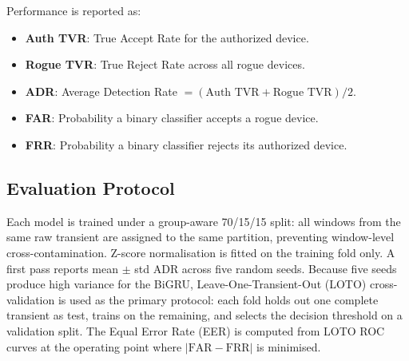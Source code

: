 Performance is reported as:
\begin{itemize}
  \item \textbf{Auth TVR}: True Accept Rate for the authorized device.
  \item \textbf{Rogue TVR}: True Reject Rate across all rogue devices.
  \item \textbf{ADR}: Average Detection Rate $= (\text{Auth TVR} + \text{Rogue TVR})/2$.
  \item \textbf{FAR}: Probability a binary classifier accepts a rogue device.
  \item \textbf{FRR}: Probability a binary classifier rejects its authorized device.
\end{itemize}

\subsection{Evaluation Protocol}
Each model is trained under a group-aware 70/15/15 split: all windows from the same raw transient are assigned to the same partition, preventing window-level cross-contamination. Z-score normalisation is fitted on the training fold only. A first pass reports mean $\pm$ std ADR across five random seeds. Because five seeds produce high variance for the BiGRU, Leave-One-Transient-Out (LOTO) cross-validation is used as the primary protocol: each fold holds out one complete transient as test, trains on the remaining, and selects the decision threshold on a validation split. The Equal Error Rate (EER) is computed from LOTO ROC curves at the operating point where $|\text{FAR}-\text{FRR}|$ is minimised.
